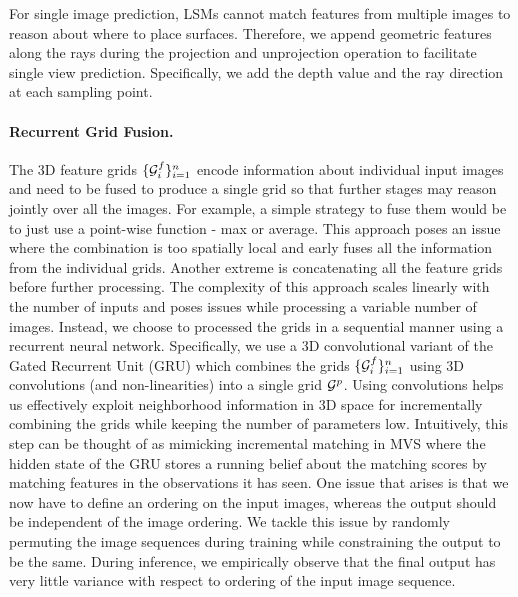 \documentclass[../thesis.tex]{subfiles}
\begin{document}
For single image prediction, LSMs cannot match features from multiple images to reason about where to place surfaces. Therefore, we append geometric features along the rays during the projection and unprojection operation to facilitate single view prediction. Specifically, we add the depth value and the ray direction at each sampling point.

\paragraph{Recurrent Grid Fusion.}
The 3D feature grids $\{\mathcal{G}^f_i\}_{i=1}^n$ encode information about individual input images and need to be fused to produce a single grid so that further stages may reason jointly over all the images. For example, a simple strategy to fuse them would be to just use a point-wise function - \eg max or average. This approach poses an issue where the combination is too spatially local and early fuses all the information from the individual grids. Another extreme is concatenating all the feature grids before further processing. The complexity of this approach scales linearly with the number of inputs and poses issues while processing a variable number of images. 
Instead, we choose to processed the grids in a sequential manner using a recurrent neural network. Specifically, we use a 3D convolutional variant of the Gated Recurrent Unit (GRU) \cite{hochreiter1997long,chogru_2014,choy20163d} which combines the grids $\{\mathcal{G}^f_i\}_{i=1}^n$ using 3D convolutions (and non-linearities) into a single grid $\mathcal{G}^p$. Using convolutions helps us effectively exploit neighborhood information in 3D space for incrementally combining the grids while keeping the number of parameters low. Intuitively, this step can be thought of as mimicking incremental matching in MVS where the hidden state of the GRU stores a running belief about the matching scores by matching features in the observations it has seen. One issue that arises is that we now have to define an ordering on the input images, whereas the output should be independent of the image ordering. We tackle this issue by randomly permuting the image sequences during training while constraining the output to be the same. During inference, we empirically observe that the final output has very little variance with respect to ordering of the input image sequence.
\end{document}
